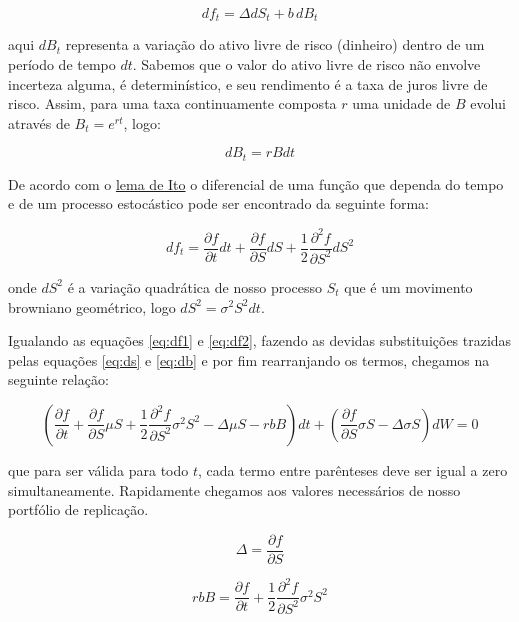 \documentclass[]{book}
\theoremstyle{definition}
\theoremstyle{definition}
\theoremstyle{definition}
\theoremstyle{remark}
\begin{document}
\begin{equation}
df_t=\Delta dS_t+b\,dB_t 
\label{eq:df1}
\end{equation}

aqui \(dB_t\) representa a variação do ativo livre de risco (dinheiro)
dentro de um período de tempo \(dt\). Sabemos que o valor do ativo livre
de risco não envolve incerteza alguma, é determinístico, e seu
rendimento é a taxa de juros livre de risco. Assim, para uma taxa
continuamente composta \(r\) uma unidade de \(B\) evolui através de
\(B_t=e^{rt}\), logo:

\begin{equation}
dB_t=rBdt
\label{eq:db}
\end{equation}

De acordo com o
\href{https://pt.wikipedia.org/wiki/Lema_de_It\%C5\%8D}{lema de Ito} o
diferencial de uma função que dependa do tempo e de um processo
estocástico pode ser encontrado da seguinte forma:

\begin{equation}
df_t=\frac{\partial f}{\partial t}dt + \frac{\partial f}{\partial S}dS + \frac{1}{2}\frac{\partial^2 f}{\partial S^2}dS^2
\label{eq:df2}
\end{equation}

onde \(dS^2\) é a variação quadrática de nosso processo \(S_t\) que é um
movimento browniano geométrico, logo \(dS^2=\sigma^2S^2dt\).

Igualando as equações \eqref{eq:df1} e \eqref{eq:df2}, fazendo as devidas
substituições trazidas pelas equações \eqref{eq:ds} e \eqref{eq:db} e por
fim rearranjando os termos, chegamos na seguinte relação:

\begin{equation}
\left( \frac{\partial f}{\partial t} + \frac{\partial f}{\partial S}\mu S + \frac{1}{2}\frac{\partial^2 f}{\partial S^2}\sigma^2 S^2 - \Delta\mu S - rbB \right)dt + \left( \frac{\partial f}{\partial S}\sigma S - \Delta \sigma S \right)dW = 0 
\end{equation}

que para ser válida para todo \(t\), cada termo entre parênteses deve
ser igual a zero simultaneamente. Rapidamente chegamos aos valores
necessários de nosso portfólio de replicação.

\begin{equation}
\Delta = \frac{\partial f}{\partial S} 
\label{eq:delta}
\end{equation}

\begin{equation}
rbB = \frac{\partial f}{\partial t}+\frac{1}{2}\frac{\partial^2 f}{\partial S^2}\sigma^2S^2 
\label{eq:rbb1}
\end{equation}
\end{document}
